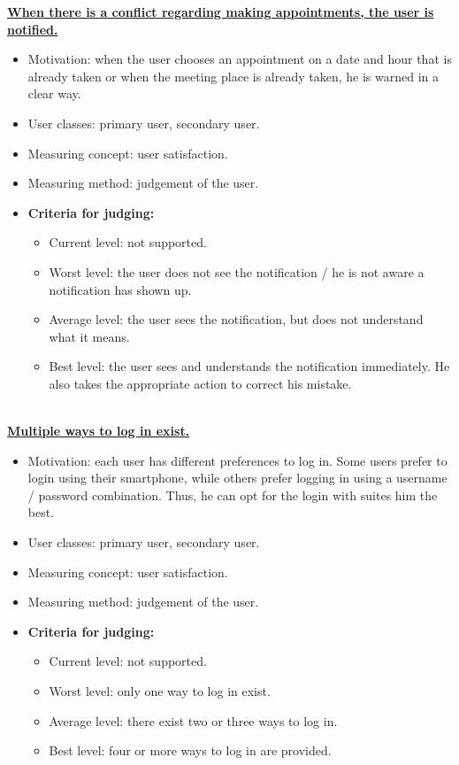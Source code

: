 \documentclass[11pt, a4paper,svglistings]{report}
\begin{document}
\textbf{\underline{When there is a conflict regarding making appointments, the user is notified.}}
\begin{itemize}
\item{Motivation: when the user chooses an appointment on a date and hour that is already taken or when the meeting place is already taken, he is warned in a clear way.}
\item{User classes: primary user, secondary user.}
\item{Measuring concept: user satisfaction.}
\item{Measuring method: judgement of the user.}
\item{\textbf{Criteria for judging:}}
\begin{itemize}
\item{Current level: not supported.}
\item{Worst level: the user does not see the notification / he is not aware a notification has shown up.}
\item{Average level: the user sees the notification, but does not understand what it means.}
\item{Best level: the user sees and understands the notification immediately. He also takes the appropriate action to correct his mistake. \\ \\}
\end{itemize}
\end{itemize}
\textbf{\underline{Multiple ways to log in exist.}}
\begin{itemize}
\item{Motivation: each user has different preferences to log in. Some users prefer to login using their smartphone, while others prefer logging in using a username / password combination. Thus, he can opt for the login with suites him the best.}
\item{User classes: primary user, secondary user.}
\item{Measuring concept: user satisfaction.}
\item{Measuring method: judgement of the user.}
\item{\textbf{Criteria for judging:}}
\begin{itemize}
\item{Current level: not supported.}
\item{Worst level: only one way to log in exist.}
\item{Average level: there exist two or three ways to log in.}
\item{Best level: four or more ways to log in are provided. \\ \\}
\end{itemize}
\end{itemize}
\end{document}
